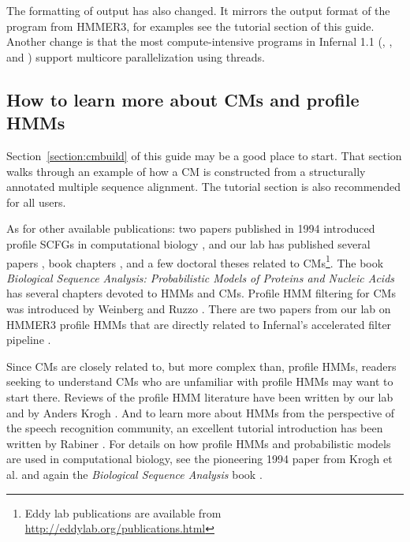The formatting of  output has also changed. It mirrors
the output format of the  program from HMMER3, for
examples see the tutorial section of this guide. Another change is
that the most compute-intensive programs in Infernal 1.1
(, ,  and
) support multicore parallelization using threads.

\subsection{How to learn more about CMs and profile HMMs}

Section~\ref{section:cmbuild} of this guide may be a good place to
start. That section walks through an example of how a CM is
constructed from a structurally annotated multiple sequence alignment.
The tutorial section is also recommended for all users.

As for other available publications: two papers published in 1994
introduced profile SCFGs in computational biology
\citep{Sakakibara94c,Eddy94}, and our lab has published several papers
\citep{Eddy02b,KleinEddy03,NawrockiEddy07,Nawrocki09,KolbeEddy09,KolbeEddy11},
book chapters \citep{Eddy06b,Nawrocki14}, and a few doctoral
theses \citep{Klein03,Nawrocki09b,Kolbe10} related to
CMs\footnote{Eddy lab publications are available from
\url{http://eddylab.org/publications.html}}. The book
\emph{Biological Sequence Analysis: Probabilistic Models of Proteins
and Nucleic Acids} \citep{Durbin98} has several chapters devoted to
HMMs and CMs. Profile HMM filtering for CMs was introduced by Weinberg
and Ruzzo
\citep{WeinbergRuzzo04,WeinbergRuzzo04b,WeinbergRuzzo06}. There are
two papers from our lab on HMMER3 profile HMMs that are directly
related to Infernal's accelerated filter pipeline
\citep{Eddy08,Eddy11}.

Since CMs are closely related to, but more complex than, profile HMMs,
readers seeking to understand CMs who are unfamiliar with profile HMMs
may want to start there.  Reviews of the profile HMM literature have
been written by our lab \citep{Eddy96,Eddy98} and by Anders Krogh
\citep{Krogh98}. And to learn more about HMMs from the perspective of
the speech recognition community, an excellent tutorial introduction
has been written by Rabiner \citep{Rabiner89}. For details on how
profile HMMs and probabilistic models are used in computational
biology, see the pioneering 1994 paper from Krogh et
al. \citep{Krogh94} and again the \emph{Biological Sequence Analysis}
book \citep{Durbin98}.

